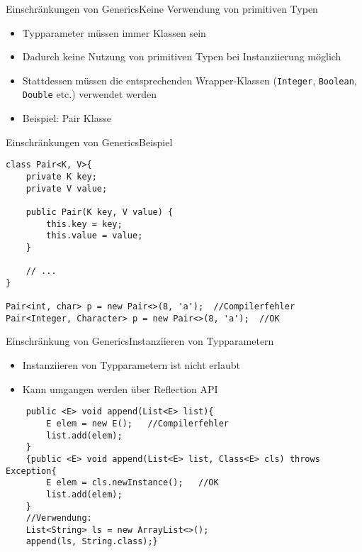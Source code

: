 \begin{frame}{Einschränkungen von Generics}{Keine Verwendung von primitiven Typen}
    \begin{itemize}
        \item Typparameter müssen immer Klassen sein
        \item Dadurch keine Nutzung von primitiven Typen bei Instanziierung möglich
        \item Stattdessen müssen die entsprechenden Wrapper-Klassen (\texttt{Integer}, \texttt{Boolean}, \texttt{Double} etc.) verwendet werden
        \item Beispiel: Pair Klasse
    \end{itemize}
\end{frame}

\begin{frame}[fragile]{Einschränkungen von Generics}{Beispiel}
\lstset{style=javacode}
\begin{lstlisting}
class Pair<K, V>{
    private K key;
    private V value;

    public Pair(K key, V value) {
        this.key = key;
        this.value = value;
    }

    // ...
}

Pair<int, char> p = new Pair<>(8, 'a');  //Compilerfehler
Pair<Integer, Character> p = new Pair<>(8, 'a');  //OK
\end{lstlisting}
\end{frame}

\begin{frame}[fragile]{Einschränkung von Generics}{Instanziieren von Typparametern}
    \begin{itemize}
        \item Instanziieren von Typparametern ist nicht erlaubt
        \item Kann umgangen werden über Reflection API
    \end{itemize}
    \lstset{style=javacode}
    \begin{lstlisting}
    public <E> void append(List<E> list){
        E elem = new E();   //Compilerfehler
        list.add(elem);
    }
    {public <E> void append(List<E> list, Class<E> cls) throws Exception{
        E elem = cls.newInstance();   //OK
        list.add(elem);
    }
    //Verwendung:
    List<String> ls = new ArrayList<>();
    append(ls, String.class);}
    \end{lstlisting}
\end{frame}

